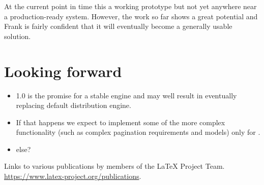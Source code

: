 \documentclass{ltnews}
\begin{document}
At the current point in time this a working prototype but not yet
anywhere near a production-ready system. However, the work so far
shows a great potential and Frank is fairly confident that it will
eventually become a generally usable solution.

\section{Looking forward}

\begin{itemize}
  \item {} 1.0 is the promise for a stable  engine
    and may well result in  eventually replacing 
    default distribution engine.
  \item If that happens we expect to implement some of the more complex
    functionality (such as complex pagination requirements and models) only for
    .
  \item else?
\end{itemize}

\begin{thebibliography}{10}
  \raggedright
    Links to various publications by members of the \LaTeX{} Project Team.
    \newblock \url{https://www.latex-project.org/publications}.
\end{thebibliography}
\end{document}
